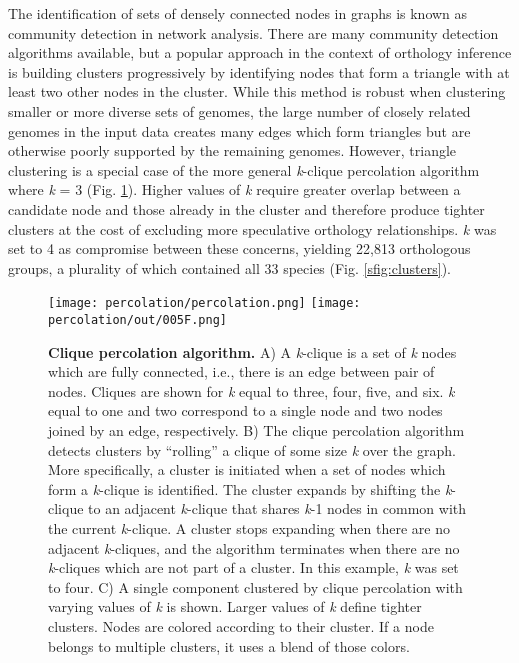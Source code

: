 \documentclass[10pt,letterpaper]{article}
\begin{document}
The identification of sets of densely connected nodes in graphs is known as community detection in network analysis. There are many community detection algorithms available, but a popular approach in the context of orthology inference is building clusters progressively by identifying nodes that form a triangle with at least two other nodes in the cluster. While this method is robust when clustering smaller or more diverse sets of genomes, the large number of closely related genomes in the input data creates many edges which form triangles but are otherwise poorly supported by the remaining genomes. However, triangle clustering is a special case of the more general \textit{k}-clique percolation algorithm where \textit{k} = 3 (Fig. \ref{fig:percolation}). Higher values of \textit{k} require greater overlap between a candidate node and those already in the cluster and therefore produce tighter clusters at the cost of excluding more speculative orthology relationships. \textit{k} was set to 4 as compromise between these concerns, yielding 22,813 orthologous groups, a plurality of which contained all 33 species (Fig. \ref{sfig:clusters}).

\begin{figure}[h!]
\texttt{[image: percolation/percolation.png]}
\texttt{[image: percolation/out/005F.png]}
\centering
\caption{\textbf{Clique percolation algorithm.}
A) A \textit{k}-clique is a set of \textit{k} nodes which are fully connected, i.e., there is an edge between pair of nodes. Cliques are shown for \textit{k} equal to three, four, five, and six. \textit{k} equal to one and two correspond to a single node and two nodes joined by an edge, respectively. B) The clique percolation algorithm detects clusters by “rolling” a clique of some size \textit{k} over the graph. More specifically, a cluster is initiated when a set of nodes which form a \textit{k}-clique is identified. The cluster expands by shifting the \textit{k}-clique to an adjacent \textit{k}-clique that shares \textit{k}-1 nodes in common with the current \textit{k}-clique. A cluster stops expanding when there are no adjacent \textit{k}-cliques, and the algorithm terminates when there are no \textit{k}-cliques which are not part of a cluster. In this example, \textit{k} was set to four. C) A single component clustered by clique percolation with varying values of \textit{k} is shown. Larger values of \textit{k} define tighter clusters. Nodes are colored according to their cluster. If a node belongs to multiple clusters, it uses a blend of those colors.}
\label{fig:percolation}
\end{figure}
\end{document}
